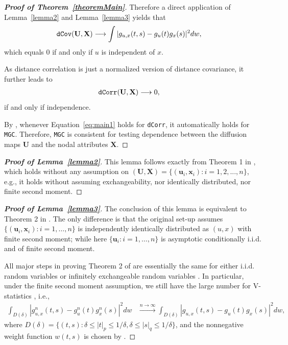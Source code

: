\documentclass[12pt]{article}
\theoremstyle{definition}
\begin{document}
\begin{proof}[\textbf{Proof of Theorem~\ref{theoremMain}}]
		Therefore a direct application of Lemma~\ref{lemma2} and Lemma~\ref{lemma3} yields that
		\begin{eqnarray}
		\mbox{\texttt{dCov}}(\mathbf{U},\mathbf{X}) &\longrightarrow \int | g_{u,x}(t,s) - g_{u}(t) g_{x}(s) |^2 dw,
		\end{eqnarray}
		which equals $0$ if and only if $u$ is independent of $x$.
		
		As distance correlation is just a normalized version of distance covariance, it further leads to
		\begin{eqnarray}
		\mbox{\texttt{dCorr}}(\mathbf{U},\mathbf{X}) &\longrightarrow 0,
		\label{eq:main1}
		\end{eqnarray}
		if and only if independence.
		
		By \cite{shen2016discovering}, whenever Equation~\ref{eq:main1} holds for \texttt{dCorr}, it automatically holds for \texttt{MGC}. Therefore, \texttt{MGC} is consistent for testing dependence between the diffusion maps $\mathbf{U}$ and the nodal attributes $\mathbf{X}$.
	\end{proof}
	
	\begin{proof}[\textbf{Proof of Lemma~\ref{lemma2}}] 
		This lemma follows exactly from Theorem 1 in \cite{szekely2007measuring}, which holds without any assumption on $(\mathbf{U}, \mathbf{X} ) =  \{(\mathbf{u}_{i},\mathbf{x}_{i}) :  i=1,2,...,n\}$, e.g., it holds without assuming exchangeability, nor identically distributed, nor finite second moment.
	\end{proof}
	
	\begin{proof}[\textbf{Proof of Lemma~\ref{lemma3}}] 
		The conclusion of this lemma is equivalent to Theorem 2 in \cite{szekely2007measuring}. The only difference is that the original set-up assumes $\{(\mathbf{u}_{i},\mathbf{x}_{i}) : i = 1, \ldots , n \}$ is independently identically distributed as $(u,x)$ with finite second moment; while here $\{  \mathbf{u}_{i} : i = 1, \ldots, n  \}$ is asymptotic conditionally i.i.d. and of finite second moment.
		
		All major steps in proving Theorem 2 of \cite{szekely2007measuring} are essentially the same for either i.i.d. random variables or infinitely exchangeable random variables \citep{InoueTaylor2006}. In particular, under the finite second moment assumption, we still have the large number for V-statistics \citep{KoroljukBook}, i.e., 
		\begin{eqnarray}
		\displaystyle\int_{D(\delta)}{|g_{u,x}^{n}(t,s)-g_{u}^{n}(t)g_{x}^{n}(s)|^{2}}dw &\stackrel{n \rightarrow \infty}{\longrightarrow} 
		\displaystyle\int_{D(\delta)}{|g_{u,x}(t,s)-g_{u}(t)g_{x}(s)|^{2}}dw,
		\label{eq:SLLN}
		\end{eqnarray}
		where $D(\delta)=\{(t,s):\delta \leq |t|_{p} \leq 1/\delta,\delta \leq |s|_{q} \leq 1/\delta\}$, and the nonnegative weight function $w(t,s)$ is chosen by \cite{szekely2007measuring}. 
	\end{proof}
	
\end{document}
